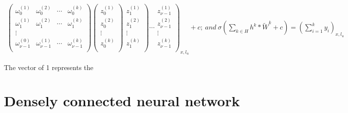\documentclass[final, paper=letter,5p,times,twocolumn]{elsarticle}
\begin{document}
\begin{strip}
  \begin{eqnarray*}
      \left(
      \begin{array}{cccc}
        \omega_{0}^{(1)} & \omega_{0}^{(2)} & \cdots & \omega_{0}^{(k)} \\
        \omega_{1}^{(1)} & \omega_{1}^{(2)} & \cdots & \omega_{1}^{(k)} \\
        \vdots \\
        \omega_{\nu-1}^{(0)} & \omega_{\nu-1}^{(1)} & \cdots & \omega_{\nu-1}^{(k)} \\
      \end{array}
      \right) \left(
      \begin{array}{c}
        z_{0}^{(1)} \\
        z_{0}^{(2)} \\
        \vdots \\
        z_{0}^{(k)} \\
      \end{array}
      \right) \left. 
      \begin{array}{c}
        z_{1}^{(1)} \\
        z_{1}^{(2)} \\
        \vdots \\
        z_{1}^{(k)} \\
      \end{array}
      \right) \cdots \left. 
      \begin{array}{c}
        z_{\nu-1}^{(1)} \\
        z_{\nu-1}^{(2)} \\
        \vdots \\
        z_{\nu-1}^{(k)} \\
      \end{array}
      \right)_{x,l_{u}} + c;~and~\sigma\left(\sum_{k \in H} h^{k}*\tilde{W}^{k} + c \right) = \left( \sum_{i=1}^{k} y_{i} \right)_{x,l_{u}}
  \end{eqnarray*}
\end{strip}

The vector of 1 represents the 

\section{Densely connected neural network}
\end{document}
